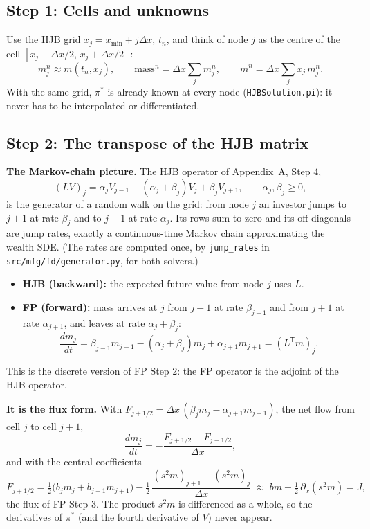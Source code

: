 \documentclass[11pt]{article}
\newcommand{\mb}{\bar m}
\begin{document}
\subsection*{Step 1: Cells and unknowns}
Use the HJB grid $x_j=x_{\min}+j\Delta x$, $t_n$, and think of node $j$ as the centre of the cell
$[x_j-\Delta x/2,\,x_j+\Delta x/2]$:
\[
  m_j^n\approx m(t_n,x_j),\qquad
  \text{mass}^n = \Delta x\sum_j m_j^n,\qquad
  \mb^n = \Delta x\sum_j x_j\,m_j^n .
\]
With the same grid, $\pi^*$ is already known at every node (\texttt{HJBSolution.pi}): it never
has to be interpolated or differentiated.

\subsection*{Step 2: The transpose of the HJB matrix}
\textbf{The Markov-chain picture.} The HJB operator of Appendix~A, Step 4,
\[
  (LV)_j = \alpha_jV_{j-1} - (\alpha_j+\beta_j)V_j + \beta_jV_{j+1},\qquad \alpha_j,\beta_j\ge0,
\]
is the generator of a random walk on the grid: from node $j$ an investor jumps to $j+1$ at rate
$\beta_j$ and to $j-1$ at rate $\alpha_j$. Its rows sum to zero and its off-diagonals are jump
rates, exactly a continuous-time Markov chain approximating the wealth SDE. (The rates are
computed once, by \texttt{jump\_rates} in \texttt{src/mfg/fd/generator.py}, for both solvers.)
\begin{itemize}
  \item \textbf{HJB (backward):} the expected future value from node $j$ uses $L$.
  \item \textbf{FP (forward):} mass arrives at $j$ from $j-1$ at rate $\beta_{j-1}$ and from
        $j+1$ at rate $\alpha_{j+1}$, and leaves at rate $\alpha_j+\beta_j$:
        \[
          \frac{dm_j}{dt} = \beta_{j-1}m_{j-1} - (\alpha_j+\beta_j)m_j + \alpha_{j+1}m_{j+1}
          = (L^{\mathsf T}m)_j .
        \]
\end{itemize}
This is the discrete version of FP Step 2: the FP operator is the adjoint of the HJB operator.

\textbf{It is the flux form.} With $F_{j+1/2}=\Delta x\,(\beta_jm_j-\alpha_{j+1}m_{j+1})$, the
net flow from cell $j$ to cell $j+1$,
\[
  \frac{dm_j}{dt} = -\frac{F_{j+1/2}-F_{j-1/2}}{\Delta x},
\]
and with the central coefficients
\[
  F_{j+1/2} = \tfrac12\bigl(b_jm_j+b_{j+1}m_{j+1}\bigr)
              - \tfrac12\,\frac{(s^2m)_{j+1}-(s^2m)_j}{\Delta x}
  \;\approx\; bm - \tfrac12\,\partial_x(s^2m) = J ,
\]
the flux of FP Step 3. The product $s^2m$ is differenced as a whole, so the derivatives of
$\pi^*$ (and the fourth derivative of $V$) never appear.
\end{document}
